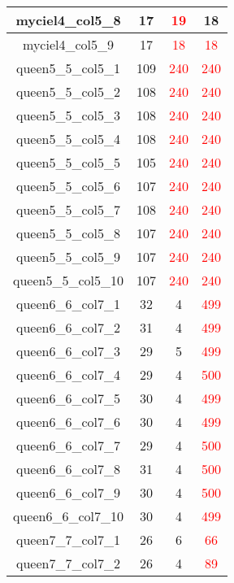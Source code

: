 \begin{longtable}{|c|c|c|c|}
  myciel4\_col5\_8 & 17 & \textcolor{red}{19} & 18 \\ \hline
  myciel4\_col5\_9 & 17 & \textcolor{red}{18} & \textcolor{red}{18} \\ \hline
  queen5\_5\_col5\_1 & 109 & \textcolor{red}{240} & \textcolor{red}{240} \\ \hline
  queen5\_5\_col5\_2 & 108 & \textcolor{red}{240} & \textcolor{red}{240} \\ \hline
  queen5\_5\_col5\_3 & 108 & \textcolor{red}{240} & \textcolor{red}{240} \\ \hline
  queen5\_5\_col5\_4 & 108 & \textcolor{red}{240} & \textcolor{red}{240} \\ \hline
  queen5\_5\_col5\_5 & 105 & \textcolor{red}{240} & \textcolor{red}{240} \\ \hline
  queen5\_5\_col5\_6 & 107 & \textcolor{red}{240} & \textcolor{red}{240} \\ \hline
  queen5\_5\_col5\_7 & 108 & \textcolor{red}{240} & \textcolor{red}{240} \\ \hline
  queen5\_5\_col5\_8 & 107 & \textcolor{red}{240} & \textcolor{red}{240} \\ \hline
  queen5\_5\_col5\_9 & 107 & \textcolor{red}{240} & \textcolor{red}{240} \\ \hline
  queen5\_5\_col5\_10 & 107 & \textcolor{red}{240} & \textcolor{red}{240} \\ \hline
  queen6\_6\_col7\_1 & 32 & 4 & \textcolor{red}{499} \\ \hline
  queen6\_6\_col7\_2 & 31 & 4 & \textcolor{red}{499} \\ \hline
  queen6\_6\_col7\_3 & 29 & 5 & \textcolor{red}{499} \\ \hline
  queen6\_6\_col7\_4 & 29 & 4 & \textcolor{red}{500} \\ \hline
  queen6\_6\_col7\_5 & 30 & 4 & \textcolor{red}{499} \\ \hline
  queen6\_6\_col7\_6 & 30 & 4 & \textcolor{red}{499} \\ \hline
  queen6\_6\_col7\_7 & 29 & 4 & \textcolor{red}{500} \\ \hline
  queen6\_6\_col7\_8 & 31 & 4 & \textcolor{red}{500} \\ \hline
  queen6\_6\_col7\_9 & 30 & 4 & \textcolor{red}{500} \\ \hline
  queen6\_6\_col7\_10 & 30 & 4 & \textcolor{red}{499} \\ \hline
  queen7\_7\_col7\_1 & 26 & 6 & \textcolor{red}{66} \\ \hline
  queen7\_7\_col7\_2 & 26 & 4 & \textcolor{red}{89} \\ \hline

\end{longtable}

